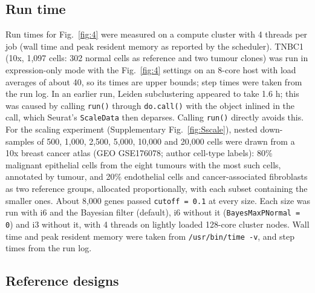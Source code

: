 \subsection{Run time}

Run times for Fig.~\ref{fig:4} were measured on a compute cluster with 4 threads per job (wall time and peak resident memory as reported by the scheduler). TNBC1 (10x, 1,097 cells: 302 normal cells as reference and two tumour clones) \citep{gao2021copykat, huang2024xclone, xclonedata} was run in expression-only mode with the Fig.~\ref{fig:4} settings on an 8-core host with load averages of about 40, so its times are upper bounds; step times were taken from the run log. In an earlier run, Leiden subclustering appeared to take 1.6 h; this was caused by calling \texttt{run()} through \texttt{do.call()} with the object inlined in the call, which Seurat's \texttt{ScaleData} then deparses. Calling \texttt{run()} directly avoids this. For the scaling experiment (Supplementary Fig.~\ref{fig:Sscale}), nested down-samples of 500, 1,000, 2,500, 5,000, 10,000 and 20,000 cells were drawn from a 10x breast cancer atlas \citep{wu2021breast} (GEO GSE176078; author cell-type labels): 80\% malignant epithelial cells from the eight tumours with the most such cells, annotated by tumour, and 20\% endothelial cells and cancer-associated fibroblasts as two reference groups, allocated proportionally, with each subset containing the smaller ones. About 8,000 genes passed \texttt{cutoff = 0.1} at every size. Each size was run with i6 and the Bayesian filter (default), i6 without it (\texttt{BayesMaxPNormal = 0}) and i3 without it, with 4 threads on lightly loaded 128-core cluster nodes. Wall time and peak resident memory were taken from \texttt{/usr/bin/time -v}, and step times from the run log.

\subsection{Reference designs}

